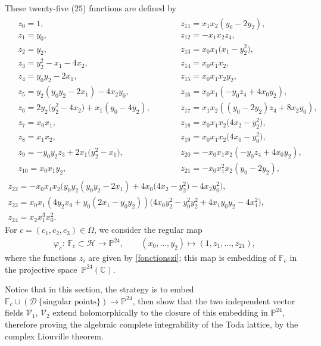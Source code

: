 \documentclass[pdftex]{sigma}
\numberwithin{equation}{section}
\begin{document}
 These twenty-five ($25$) functions are defined by
\begin{gather}
\begin{aligned}
 &z_0= 1,\qquad && z_{11}= x_1x_2 (y_0-2y_2 ),&\\
& z_1= y_0,\qquad && z_{12}= -x_1x_2z_4,&\\
& z_2= y_2,\qquad && z_{13}= x_0x_1 \bigl(x_1-y_2^2 \bigr),& \\
& z_3= y_2^2 -x_1-4x_2,\qquad && z_{14}= x_0x_1x_2,&\\
& z_4= y_0y_2-2x_1,\qquad && z_{15}= x_0x_1x_2y_2 ,&\\
 & z_5=y_2 (y_0y_2-2x_1 )-4x_2y_0,\qquad && z_{16}= x_0x_1 (-y_0z_4+4x_0y_2 ),&\\
 & z_6= 2y_2 \bigl(y_2^2-4x_2 \bigr)+x_1 (y_0-4y_2 ),\qquad && z_{17}= x_1x_2 ( (y_0-2y_2 )z_4+8x_2y_0 ),& \\
& z_7= x_0x_1,\qquad && z_{18}= x_0x_1x_2 \bigl(4x_2-y_2^2 \bigr),&\\
 &z_8= x_1x_2,\qquad && z_{19}=x_0x_1x_2 \bigl(4x_0-y_0^2 \bigr),&\\
& z_9= -y_0y_2z_3+2x_1 \bigl(y_2^2-x_1 \bigr),\qquad && z_{20}=-x_0x_1x_2 ( -y_0z_4+4x_0y_2 ),&\\
& z_{10}= x_0x_1y_2,\qquad && z_{21}=-x_0x_1^2x_2 (y_0-2y_2 ),&
 \end{aligned}\nonumber\\
 z_{22}= -x_0x_1x_2 \bigl(y_0y_2 (y_0y_2-2x_1 )+4x_0 \bigl(4x_2-y_2^2 \bigr)-4x_2y_0^2 \bigr),\nonumber\\
z_{23}= x_0x_1 (4y_2x_0+y_0 (2x_1-y_0y_2 ) ) \bigl(4x_0y_2^2-y_0^2y_2^2+4x_1y_0y_2-4x_1^2 \bigr),\nonumber\\
 z_{24}= x_2x_1^3x_0^2.\label{fonctionszi}
\end{gather}
 For $c=(c_1,c_2,c_3)\in \Omega$, we consider the regular map
\begin{align}
 \varphi_c\colon \ \mathbb{F}_c \subset\mathcal{H} \longrightarrow \mathbb{P}^{24},\qquad
 (x_0,\dots,y_2 ) \longmapsto (1,z_1,\dots,z_{24} ),\label{plongementP24}
\end{align}
 where the functions $z_i$ are given by \eqref{fonctionszi}; this map
 is embedding of $\mathbb{F}_c$ in the projective space~$\mathbb{P}^{24}(\mathbb{C})$.

Notice that in this section, the strategy is to embed $\mathbb{F}_c
\cup (\mathcal{D} \ \mbox{\{singular
points\}})\longrightarrow \mathbb{P}^{24}$, then show that the
two independent vector fields $\mathcal{V}_1$, $\mathcal{V}_2$ extend
holomorphically to the closure of this embedding in
$\mathbb{P}^{24}$, therefore proving the algebraic complete
integrability of the  Toda lattice, by the
complex Liouville theorem.
\end{document}
